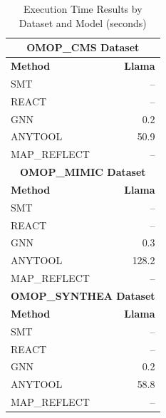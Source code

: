 \begin{table}[htbp]
\centering
\caption{Execution Time Results by Dataset and Model (seconds)}
\label{tab:execution_times}
\begin{tabular}{lr}
\toprule
\multicolumn{2}{c}{\textbf{OMOP_CMS Dataset}} \\
\midrule
\textbf{Method} & \textbf{Llama} \\
\midrule
SMT & -- \\
REACT & -- \\
GNN & 0.2 \\
ANYTOOL & 50.9 \\
MAP_REFLECT & -- \\
\midrule
\multicolumn{2}{c}{\textbf{OMOP_MIMIC Dataset}} \\
\midrule
\textbf{Method} & \textbf{Llama} \\
\midrule
SMT & -- \\
REACT & -- \\
GNN & 0.3 \\
ANYTOOL & 128.2 \\
MAP_REFLECT & -- \\
\midrule
\multicolumn{2}{c}{\textbf{OMOP_SYNTHEA Dataset}} \\
\midrule
\textbf{Method} & \textbf{Llama} \\
\midrule
SMT & -- \\
REACT & -- \\
GNN & 0.2 \\
ANYTOOL & 58.8 \\
MAP_REFLECT & -- \\
\bottomrule
\end{tabular}
\end{table}